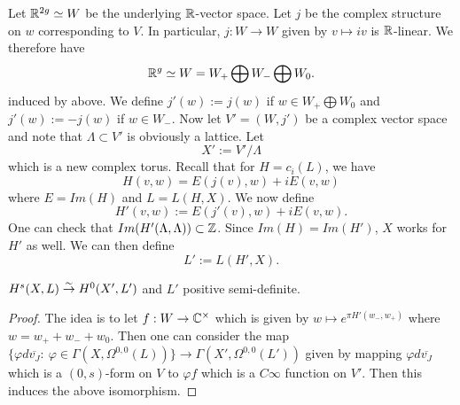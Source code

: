 Let ${\mathbb R}^{2g}\simeq W$ be the underlying ${\mathbb R}$-vector space. Let $j$ be the complex structure on $w$ corresponding to $V$. In particular, $j:W\to W$ given by $v\mapsto iv$ is ${\mathbb R}$-linear. We therefore have 
$${\mathbb R}^g\simeq W = W_+\bigoplus W_- \bigoplus W_0.$$
induced by above. We define $j'(w):=j(w)$ if $w\in W_+\bigoplus W_0$ and $j'(w):=-j(w)$ if $w\in W_-$. Now let $V'=(W,j')$ be a complex vector space and note that $\Lambda\subset V'$ is obviously a lattice. Let 
$$X':=V'/\Lambda$$
which is a new complex torus. Recall that for $H=c_i(L)$, we have 
$$H(v,w)=E(j(v),w)+i E(v,w)$$
where $E=Im(H)$ and $L=L(H,X)$. We now define 
$$H'(v,w):=E(j'(v),w)+iE(v,w).$$
One can check that $Im(H'(\Lambda,\Lambda))\subset {\mathbb Z}$. Since $Im(H)=Im(H')$, $X$ works for $H'$ as well. We can then define
$$L':=L(H',X).$$

\begin{theorem}
$H^s(X,L)\overset{\sim}{\rightarrow} H^0(X',L')$ and $L'$ positive semi-definite. 
\end{theorem}

\begin{proof}
The idea is to let $f:W\to {\mathbb C}^\times$ which is given by $w\mapsto e^{\pi H'(w_-,w_+)}$ where $w=w_+ + w_- +w_0$. Then one can consider the map $\{\varphi d\overline{v_J}:\ \varphi\in \Gamma(X,\Omega^{0,0}(L))\}\to \Gamma(X',\Omega^{0,0}(L'))$ given by mapping $\varphi d\overline{v_J}$ which is a $(0,s)$-form on $V$ to $\varphi f$ which is a $C\infty$ function on $V'$. Then this induces the above isomorphism.
\end{proof}